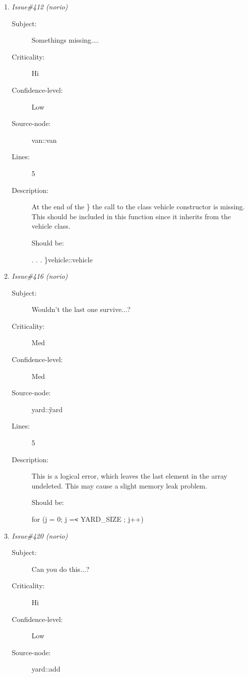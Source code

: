 \begin{enumerate}
\begin{description}
\item [Lines:] 5

\item [Description:] This line can be deleted since this function inherits from
 the vehicle class and the vehicle print function was
 declared virtual.  This means that the compiler will call
 the print function automatically.

 Should be:

 Deleted.
\end{description}
\item {\it Issue\#412 (norio)}
\begin{description}
\item [Subject:] Somethings missing....
\item [Criticality:] Hi
\item [Confidence-level:] Low
\item [Source-node:] van::van

\item [Lines:] 5

\item [Description:] At the end of the \} the call to the class vehicle constructor is missing.
This should be included in this
 function since it inherits from the vehicle class.

 Should be:

 .
 .
 .
 \}vehicle::vehicle
\end{description}
\item {\it Issue\#416 (norio)}
\begin{description}
\item [Subject:] Wouldn't the last one survive...?
\item [Criticality:] Med
\item [Confidence-level:] Med
\item [Source-node:] yard::\~yard

\item [Lines:] 5

\item [Description:] This is a logical error, which leaves the last element
 in the array undeleted.  This may cause a slight memory
 leak problem.

 Should be:

 for (j = 0; j ={\tt <} YARD\_SIZE ; j++)
\end{description}
\item {\it Issue\#420 (norio)}
\begin{description}
\item [Subject:] Can you do this...?
\item [Criticality:] Hi
\item [Confidence-level:] Low
\item [Source-node:] yard::add


\end{description}
\end{enumerate}
